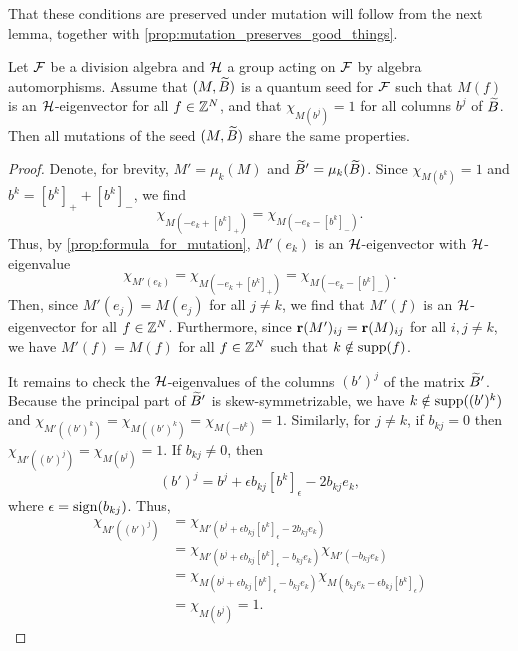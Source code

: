 That these conditions are preserved under mutation will follow from the next lemma,
together with \cref{prop:mutation_preserves_good_things}.
\begin{lemma}\label{lem:equivariance_mutations}

	Let $\mathcal{F}$ be a division algebra and $\mathcal{H}$ a group acting on $\mathcal{F}$ by algebra
	automorphisms. Assume that $(M, \widetilde{B})$ is a quantum seed for $\mathcal{F}$ such that $M(f)$ is
	an $\mathcal{H}$-eigenvector for all $f \in \mathbb{Z}^N$, and that $\chi_{M(b^j)} = 1$ for all
	columns $b^j$ of $\widetilde{B}$. Then all mutations of the seed $(M, \widetilde{B})$ share the same
	properties.
\end{lemma}
\begin{proof}
	Denote, for brevity, $M' = \mu_k(M)$ and $\widetilde{B}' = \mu_k(\widetilde{B})$. Since $\chi_{M(b^k)} = 1$ and $b^k = [b^k]_{+} + [b^k]_{-}$, we find
	\begin{equation*}
		\chi_{M(-e_k + [b^k]_{+})} = \chi_{M(-e_k - [b^k]_{-})}.
	\end{equation*}
	Thus, by \cref{prop:formula_for_mutation}, $M'(e_k)$ is an $\mathcal{H}$-eigenvector with
	$\mathcal{H}$-eigenvalue
	\begin{equation*}
		\chi_{M'(e_k)} = \chi_{M(-e_k + [b^k]_{+})} = \chi_{M(-e_k - [b^k]_{-})}.
	\end{equation*}
	Then, since $M'(e_j) = M(e_j)$ for all $j \neq k$, we find that $M'(f)$ is an $\mathcal{H}$-eigenvector for all $f \in \mathbb{Z}^N$. Furthermore, since $\mathbf{r}(M')_{ij} = \mathbf{r}(M)_{ij}$ for all $i,j \neq k$, we have $M'(f) = M(f)$ for all $f \in \mathbb{Z}^N$ such that $k \notin \operatorname{supp}(f)$.

	It remains to check the $\mathcal{H}$-eigenvalues of the columns $(b')^j$ of the matrix
	$\widetilde{B}'$. Because the principal part of $\widetilde{B}'$ is skew-symmetrizable, we have $k \notin
		\operatorname{supp}((b')^k)$ and $\chi_{M'((b')^k)} = \chi_{M((b')^k)} = \chi_{M(-b^k)} = 1$.
	Similarly, for $j \neq k$, if $b_{kj} = 0$ then $\chi_{M'((b')^j)} = \chi_{M(b^j)} =
		1$. If $b_{kj} \neq 0$, then
	\begin{equation*}
		(b')^j = b^j + \epsilon b_{kj}[b^k]_{\epsilon} - 2 b_{kj}e_k,
	\end{equation*}
	where $\epsilon = \operatorname{sign}(b_{kj})$. Thus,
	\begin{align*}
		\chi_{M'((b')^j)}
		 & = \chi_{M'(b^j + \epsilon b_{kj}[b^k]_\epsilon - 2b_{kj} e_k)}                                                  \\
		 & = \chi_{M'(b^j + \epsilon b_{kj}[b^k]_\epsilon - b_{kj} e_k)}\chi_{M'(-b_{kj}e_k)}                              \\
		 & = \chi_{M(b^j + \epsilon b_{kj}[b^k]_\epsilon - b_{kj} e_k)}\chi_{M(b_{kj}e_k - \epsilon b_{kj}[b^k]_\epsilon)} \\
		 & = \chi_{M(b^j)} = 1.
	\end{align*}
\end{proof}

